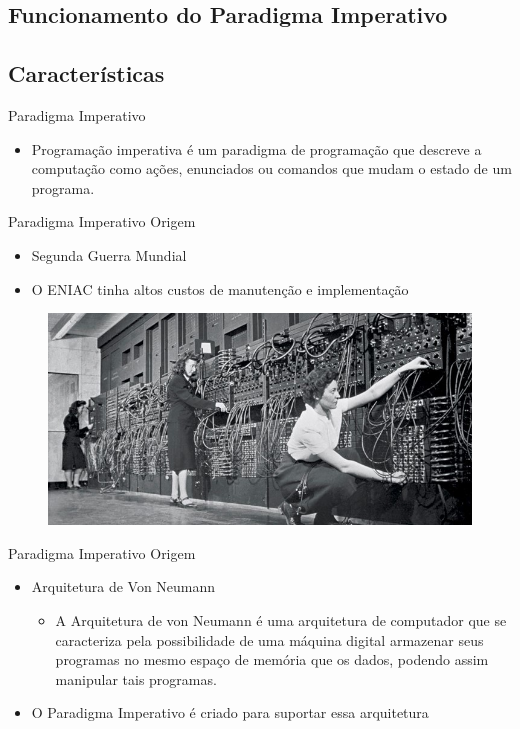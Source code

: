 \documentclass{beamer}
\begin{document}
\subsection{Funcionamento do Paradigma Imperativo}
\subsection{Características}

\begin{frame}{Paradigma Imperativo}
  \begin{itemize}
    \item{Programação imperativa é um paradigma de programação que descreve a computação como ações, enunciados ou comandos que mudam o estado de um programa.}
  \end{itemize}
\end{frame}

\begin{frame}{Paradigma Imperativo}
    Origem
    \begin{itemize}
      \item{Segunda Guerra Mundial}
      \item{O ENIAC tinha altos custos de manutenção e implementação} 
  \end{itemize}
  \begin{figure}
    \centering
    \includegraphics[scale=0.5]{eniac.jpg}
    \label{Rótulo}
  \end{figure}
\end{frame}

\begin{frame}{Paradigma Imperativo}
    Origem
    \begin{itemize}
        \item{Arquitetura de Von Neumann}
        \begin{itemize}
            \item{A Arquitetura de von Neumann é uma arquitetura de computador que se caracteriza pela possibilidade de uma máquina digital armazenar seus programas no mesmo espaço de memória que os dados, podendo assim manipular tais programas.}
        \end{itemize}
        \item{O Paradigma Imperativo é criado para suportar essa arquitetura}
    \end{itemize}
\end{frame}
\end{document}
